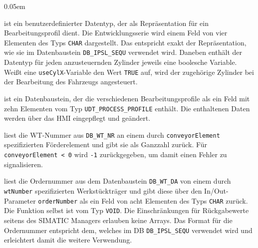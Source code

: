 \begin{description}
    \itemsep 0.05em
    \item [\texttt{UDT\_PROCESS\_PROFILE}] ist ein benutzerdefinierter Datentyp, der als Repräsentation für ein Bearbeitungsprofil dient. Die Entwicklungsserie wird einem Feld von vier Elementen des Typs \texttt{CHAR} dargestellt. Das entspricht exakt der Repräsentation, wie sie im Datenbaustein \texttt{DB\_IPSL\_SEQU} verwendet wird. Daneben enthält der Datentyp für jeden anzusteuernden Zylinder jeweils eine boolesche Variable. Weißt eine \texttt{useCylX}-Variable den Wert \texttt{TRUE} auf, wird der zugehörige Zylinder bei der Bearbeitung des Fahrzeugs angesteuert.\leer
    
    \item [\texttt{DB\_TYPE\_ADMIN}:] ist ein Datenbaustein, der die verschiedenen Bearbeitungsprofile als ein Feld mit zehn Elementen vom Typ \texttt{UDT\_PROCESS\_PROFILE} enthält. Die enthaltenen Daten werden über das HMI eingepflegt und geändert.\leer
    
    \item [\texttt{FC\_GET\_WT\_NO(conveyorElement:INT):INT}] liest die WT-Nummer aus \texttt{DB\_WT\_NR} an einem durch \texttt{conveyorElement} spezifizierten Förderelement und gibt sie als Ganzzahl zurück.  Für \texttt{conveyorElement < 0} wird \texttt{-1} zurückgegeben, um damit einen Fehler zu signalisieren.\leer
    
    \item [\texttt{FC\_GET\_OR(wtNumber:INT, orderNumber:CHAR[8]):VOID}] liest die Ordernummer aus dem Datenbaustein \texttt{DB\_WT\_DA} von einem durch \texttt{wtNumber} spezifizierten Werkstückträger und gibt diese über den In/Out-Parameter \texttt{orderNumber} als ein Feld von acht Elementen des Typs \texttt{CHAR} zurück. Die Funktion selbst ist vom Typ \texttt{VOID}. Die Einschränkungen für Rückgabewerte seitens des SIMATIC Managers erlauben keine Arrays. Das Format für die Ordernummer entspricht dem, welches im DB \texttt{DB\_IPSL\_SEQU} verwendet wird und erleichtert damit die weitere Verwendung.\leer
    

\end{description}
